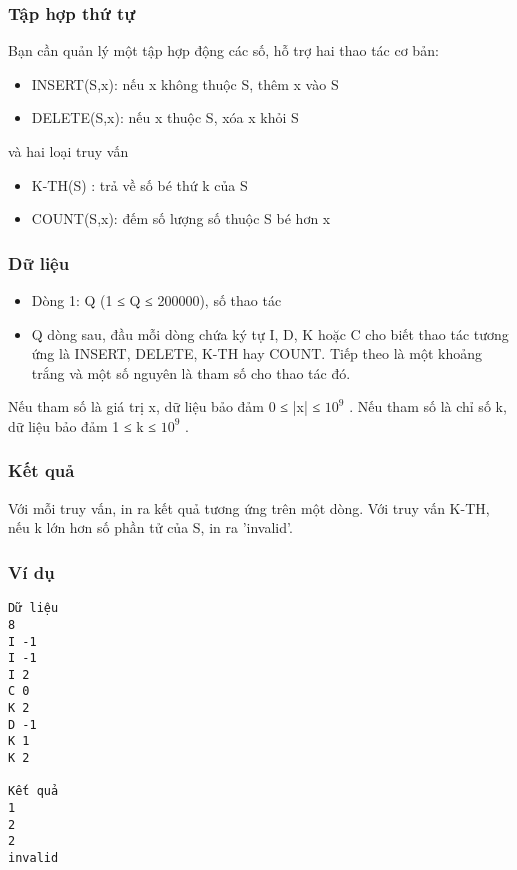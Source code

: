 



\subsubsection{   Tập hợp thứ tự  }

   Bạn cần quản lý một tập hợp động các số, hỗ trợ hai thao tác cơ bản:  
\begin{itemize}
	\item     INSERT(S,x): nếu x không thuộc S, thêm x vào S   
	\item     DELETE(S,x): nếu x thuộc S, xóa x khỏi S   
\end{itemize}

   và hai loại truy vấn  
\begin{itemize}
	\item     K-TH(S) : trả về số bé thứ k của S   
	\item     COUNT(S,x): đếm số lượng số thuộc S bé hơn x   
\end{itemize}

\subsubsection{   Dữ liệu  }
\begin{itemize}
	\item     Dòng 1: Q (1 ≤ Q ≤ 200000), số thao tác   
	\item     Q dòng sau, đầu mỗi dòng chứa ký tự I, D, K hoặc C cho biết thao tác tương ứng là INSERT, DELETE, K-TH hay COUNT. Tiếp theo là một khoảng trắng và một số nguyên là tham số cho thao tác đó.   
\end{itemize}

   Nếu tham số là giá trị x, dữ liệu bảo đảm 0 ≤ |x| ≤ $10^{9}$   . Nếu tham số là chỉ số k, dữ liệu bảo đảm 1 ≤ k ≤ $10^{9}$   .  

\subsubsection{   Kết quả  }

   Với mỗi truy vấn, in ra kết quả tương ứng trên một dòng. Với truy vấn K-TH, nếu k lớn hơn số phần tử của S, in ra 'invalid'.  

\subsubsection{   Ví dụ  }
\begin{verbatim}
Dữ liệu
8
I -1
I -1
I 2
C 0
K 2
D -1
K 1
K 2

Kết quả
1
2
2
invalid
\end{verbatim}

